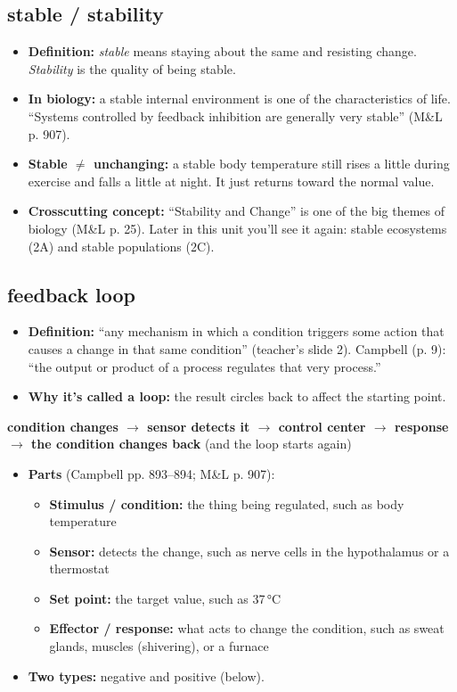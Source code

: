 \documentclass[11pt,letterpaper]{article}
\begin{document}
\subsection{stable / stability}
\begin{itemize}
  \item \textbf{Definition:} \emph{stable} means staying about the same and resisting change. \emph{Stability} is the quality of being stable.
  \item \textbf{In biology:} a stable internal environment is one of the characteristics of life. ``Systems controlled by feedback inhibition are generally very stable'' (M\&L p. 907).
  \item \textbf{Stable $\neq$ unchanging:} a stable body temperature still rises a little during exercise and falls a little at night. It just returns toward the normal value.
  \item \textbf{Crosscutting concept:} ``Stability and Change'' is one of the big themes of biology (M\&L p. 25). Later in this unit you'll see it again: stable ecosystems (2A) and stable populations (2C).
\end{itemize}

\subsection{feedback loop}
\begin{itemize}
  \item \textbf{Definition:} ``any mechanism in which a condition triggers some action that causes a change in that same condition'' (teacher's slide 2). Campbell (p. 9): ``the output or product of a process regulates that very process.''
  \item \textbf{Why it's called a loop:} the result circles back to affect the starting point.
\end{itemize}

  \textbf{condition changes $\rightarrow$ sensor detects it $\rightarrow$ control center $\rightarrow$ response $\rightarrow$ the condition changes back} (and the loop starts again)

\begin{itemize}
  \item \textbf{Parts} (Campbell pp. 893–894; M\&L p. 907):
  \begin{itemize}
    \item \textbf{Stimulus / condition:} the thing being regulated, such as body temperature
    \item \textbf{Sensor:} detects the change, such as nerve cells in the hypothalamus or a thermostat
    \item \textbf{Set point:} the target value, such as 37\,°C
    \item \textbf{Effector / response:} what acts to change the condition, such as sweat glands, muscles (shivering), or a furnace
  \end{itemize}
  \item \textbf{Two types:} negative and positive (below).
\end{itemize}
\end{document}
